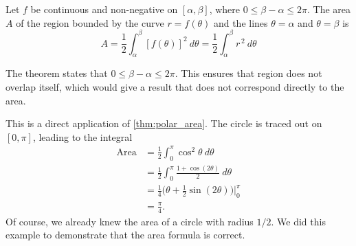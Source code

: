 
{Let $f$ be continuous and non-negative on $[\alpha,\beta]$, where $0\leq \beta-\alpha\leq 2\pi$. The area  $A$ of the region bounded by the curve $r=f(\theta)$ and the lines $\theta=\alpha$ and $\theta=\beta$ is 
\[
A=\frac12\int_\alpha^\beta[f(\theta)]^2 \ d\theta
=\frac12\int_\alpha^\beta r^{\,2} \ d\theta
\]}

The theorem states that $0\leq \beta-\alpha\leq 2\pi$. This ensures that region does not overlap itself, which would give a result that does not correspond directly to the area.

{This is a direct application of \autoref{thm:polar_area}. The circle is traced out on $[0,\pi]$, leading to the integral
\begin{align*}
	\text{Area} &= \frac12\int_0^\pi \cos^2\theta\ d  \theta \\
	&= \frac12\int_0^\pi \frac{1+\cos(2\theta)}{2}\ d\theta\\
	&= \frac14\big(\theta +\frac12\sin(2\theta)\big)\Bigg|_0^\pi\\
	&= \frac\pi4.
\end{align*}
Of course, we already knew the area of a circle with radius $1/2$. We did this example to demonstrate that the area formula is correct.}

